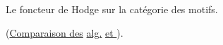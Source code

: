 Le foncteur de Hodge sur la catégorie des motifs.

(\uline{Comparaison des} \uline{ alg.} \uline{et }).
